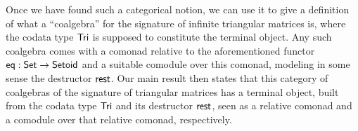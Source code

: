 \documentclass{llncs}
\newcommand{\fat}[1]{\textbf{#1}}
\begin{document}
  Once we have found such a categorical notion, we can use 
  it to give a definition of what a \enquote{coalgebra} for the signature of infinite triangular matrices is, 
  where the codata type $\mathsf{Tri}$ is supposed to constitute the terminal object.
  Any such coalgebra comes with a comonad relative to the aforementioned functor $\mathsf{eq} : \mathsf{Set}\to\mathsf{Setoid}$
  and a suitable comodule over this comonad, modeling in some sense the destructor $\mathsf{rest}$.
  Our main result then states that this category of coalgebras of the signature of triangular matrices 
  has a terminal object, built from the codata type $\mathsf{Tri}$ and its destructor $\mathsf{rest}$,
  seen as a relative comonad and a comodule over that relative comonad, respectively.
% 
% 
% 
% 
% 
% 
% 
% 
\end{document}
